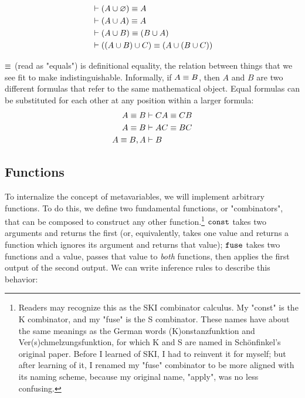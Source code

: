 \documentclass{article}
\begin{document}
  \begin{align*}
    &\vdash (A \cup \varnothing) \equiv A\\
    &\vdash (A \cup A) \equiv A\\
    &\vdash (A \cup B) \equiv (B \cup A)\\
    &\vdash ((A \cup B) \cup C) \equiv (A \cup (B \cup C))\\
  \end{align*}
  
  $\equiv$ (read as "equals") is definitional equality, the relation between things that we see fit to make indistinguishable. Informally, if $A \equiv B$, then $A$ and $B$ are two different formulas that refer to the same mathematical object. Equal formulas can be substituted for each other at any position within a larger formula:
  \begin{align*}
    A \equiv B &\vdash CA \equiv CB\\
    A \equiv B &\vdash AC \equiv BC\\
    A \equiv B, A &\vdash B\\
  \end{align*}
  
  \subsection{Functions}
  
  To internalize the concept of metavariables, we will implement arbitrary functions. To do this, we define two fundamental functions, or "combinators", that can be composed to construct any other function.\footnote{Readers may recognize this as the SKI combinator calculus. My "const" is the K combinator, and my "fuse" is the S combinator. These names have about the same meanings as the German words (K)onstanzfunktion and Ver(s)chmelzungsfunktion, for which K and S are named in Schönfinkel's original paper. Before I learned of SKI, I had to reinvent it for myself; but after learning of it, I renamed my "fuse" combinator to be more aligned with its naming scheme, because my original name, "apply", was no less confusing.} $\operatorname{\texttt{const}}$ takes two arguments and returns the first (or, equivalently, takes one value and returns a function which ignores its argument and returns that value); $\operatorname{\texttt{fuse}}$ takes two functions and a value, passes that value to \emph{both} functions, then applies the first output of the second output. We can write inference rules to describe this behavior:
  
\end{document}
